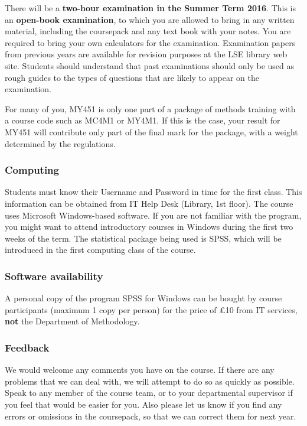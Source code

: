 \documentclass[11pt,a4paper,openany]{book}
\begin{document}
There will be a \textbf{two-hour examination in the Summer Term 2016}.
This is an \textbf{open-book examination}, to which you are allowed to
bring in any written material, including the coursepack and any text
book with your notes. You are required to bring your own calculators for
the examination. Examination papers from previous years are available
for revision purposes at the LSE library web site. Students should
understand that past examinations should only be used as rough guides to
the types of questions that are likely to appear on the examination.

For many of you, MY451 is only one part of a package of methods training
with a course code such as MC4M1 or MY4M1. If this is the case, your
result for MY451 will contribute only part of the final mark for the
package, with a weight determined by the regulations.

\subsubsection*{Computing}\label{computing}

Students must know their Username and Password in time for the first
class. This information can be obtained from IT Help Desk (Library, 1st
floor). The course uses Microsoft Windows-based software. If you are not
familiar with the program, you might want to attend introductory courses
in Windows during the first two weeks of the term. The statistical
package being used is SPSS, which will be introduced in the first
computing class of the course.

\subsubsection*{Software availability}\label{software-availability}

A personal copy of the program SPSS for Windows can be bought by course
participants (maximum 1 copy per person) for the price of £10 from IT
services, \textbf{not} the Department of Methodology.

\subsubsection*{Feedback}\label{feedback}

We would welcome any comments you have on the course. If there are any
problems that we can deal with, we will attempt to do so as quickly as
possible. Speak to any member of the course team, or to your
departmental supervisor if you feel that would be easier for you. Also
please let us know if you find any errors or omissions in the
coursepack, so that we can correct them for next year.
\end{document}
